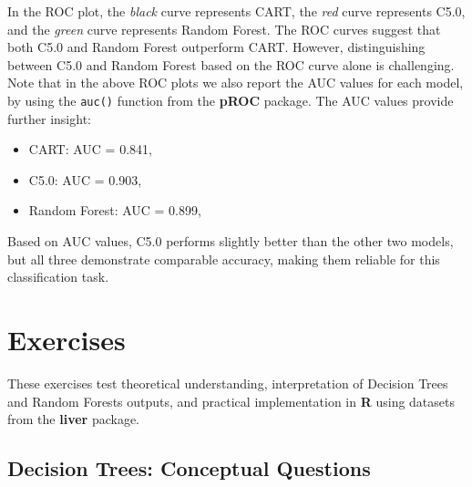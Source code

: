 \documentclass[
  11pt,
]{book}
\newcommand{\passthrough}[1]{#1}
\providecommand{\tightlist}{%
  \setlength{\itemsep}{0pt}\setlength{\parskip}{0pt}}
\theoremstyle{definition}
\theoremstyle{definition}
\theoremstyle{definition}
\theoremstyle{definition}
\theoremstyle{remark}
\begin{document}
In the ROC plot, the \emph{black} curve represents CART, the {\emph{red}} curve represents C5.0, and the {\emph{green}} curve represents Random Forest. The ROC curves suggest that both C5.0 and Random Forest outperform CART. However, distinguishing between C5.0 and Random Forest based on the ROC curve alone is challenging. Note that in the above ROC plots we also report the AUC values for each model, by using the \passthrough{\lstinline!auc()!} function from the \textbf{pROC} package. The AUC values provide further insight:

\begin{itemize}
\tightlist
\item
  CART: AUC = 0.841,\\
\item
  C5.0: AUC = 0.903,
\item
  Random Forest: AUC = 0.899,
\end{itemize}

Based on AUC values, C5.0 performs slightly better than the other two models, but all three demonstrate comparable accuracy, making them reliable for this classification task.

\section{Exercises}\label{tree-exercises}

These exercises test theoretical understanding, interpretation of Decision Trees and Random Forests outputs, and practical implementation in \textbf{R} using datasets from the \textbf{liver} package.

\subsection*{Decision Trees: Conceptual Questions}\label{decision-trees-conceptual-questions}
\end{document}
